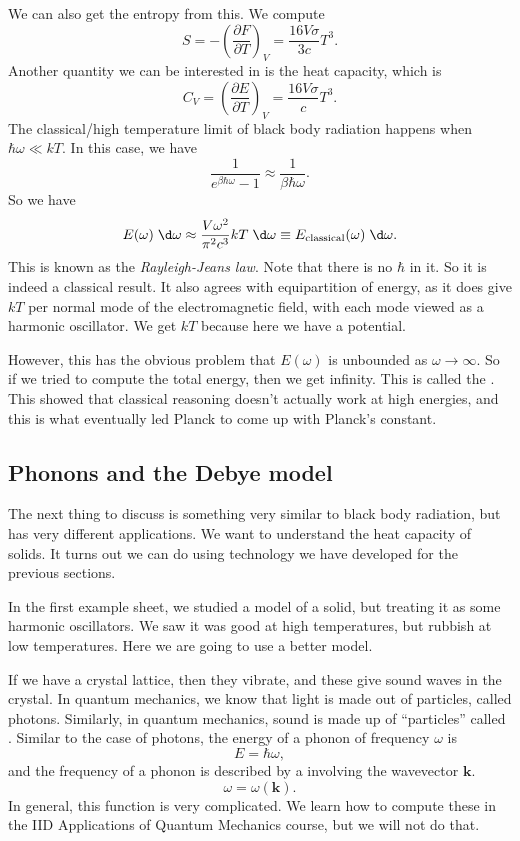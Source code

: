 \documentclass[a4paper]{article}
\begin{document}
We can also get the entropy from this. We compute
\[
  S = -\left(\frac{\partial F}{\partial T}\right)_V = \frac{16 V \sigma}{3c}T^3.
\]
Another quantity we can be interested in is the heat capacity, which is
\[
  C_V = \left(\frac{\partial E}{\partial T}\right)_V = \frac{16 V \sigma}{c} T^3.
\]
The classical/high temperature limit of black body radiation happens when $\hbar \omega \ll kT$. In this case, we have
\[
  \frac{1}{e^{\beta \hbar \omega} - 1} \approx \frac{1}{\beta \hbar \omega}.
\]
So we have
\[
  E(\omega) \;\d \omega \approx \frac{V \omega^2}{\pi^2 c^3}kT \;\d \omega \equiv E_{\mathrm{classical}} (\omega) \;\d \omega.
\]
This is known as the \emph{Rayleigh-Jeans law}. Note that there is no $\hbar$ in it. So it is indeed a classical result. It also agrees with equipartition of energy, as it does give $kT$ per normal mode of the electromagnetic field, with each mode viewed as a harmonic oscillator. We get $kT$ because here we have a potential. %

However, this has the obvious problem that $E(\omega)$ is unbounded as $\omega \to \infty$. So if we tried to compute the total energy, then we get infinity. This is called the . This showed that classical reasoning doesn't actually work at high energies, and this is what eventually led Planck to come up with Planck's constant.

\subsection{Phonons and the Debye model}
The next thing to discuss is something very similar to black body radiation, but has very different applications. We want to understand the heat capacity of solids. It turns out we can do using technology we have developed for the previous sections.

In the first example sheet, we studied a model of a solid, but treating it as some harmonic oscillators. We saw it was good at high temperatures, but rubbish at low temperatures. Here we are going to use a better model.

If we have a crystal lattice, then they vibrate, and these give sound waves in the crystal. In quantum mechanics, we know that light is made out of particles, called photons. Similarly, in quantum mechanics, sound is made up of ``particles'' called . Similar to the case of photons, the energy of a phonon of frequency $\omega$ is
\[
  E = \hbar \omega,
\]
and the frequency of a phonon is described by a  involving the wavevector $\mathbf{k}$.
\[
  \omega = \omega(\mathbf{k}).
\]
In general, this function is very complicated. We learn how to compute these in the IID Applications of Quantum Mechanics course, but we will not do that.
\end{document}
